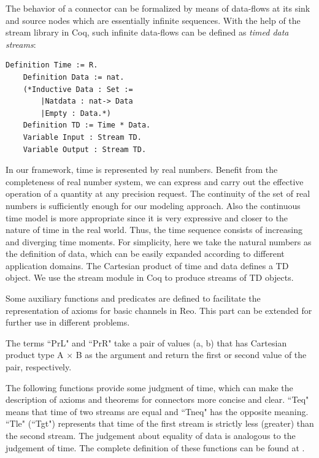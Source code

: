 \documentclass[3p,times]{elsarticle}
\begin{document}
The behavior of a connector can be formalized by means of data-flows at its sink and source nodes which are essentially infinite sequences. With the help of the stream library in Coq, such infinite data-flows can be defined as \emph{timed data streams}:
\begin{lstlisting}[language=coq]
    Definition Time := R.
    Definition Data := nat.
    (*Inductive Data : Set :=
        |Natdata : nat-> Data
        |Empty : Data.*)
    Definition TD := Time * Data.
    Variable Input : Stream TD.
    Variable Output : Stream TD.
\end{lstlisting}
%
In our framework, time is represented by real numbers. Benefit from the completeness of real number system, we can express and carry out the effective operation of a quantity at any precision request.
The continuity of the set of real numbers is sufficiently enough for our modeling approach. Also the
continuous time model is more appropriate since it is very expressive and closer to the nature of time in the real world. Thus, the time sequence consists of increasing and diverging time moments. For simplicity, here we take the natural numbers as the definition of data, which can be easily expanded according to different application domains. The Cartesian product of time and data defines a TD object.
We use the stream module in Coq to produce streams of TD objects.

Some auxiliary functions and predicates are defined to facilitate the representation of axioms for basic channels in Reo. This part can be extended for further use in different problems.

The terms ``PrL" and ``PrR" take a pair of values (a, b) that has Cartesian product type A $\times$ B as the argument and return the first or second value of the pair, respectively.

The following functions provide some judgment of time, which can make
the description of axioms and theorems for connectors more concise and
clear. ``Teq" means that time of two streams are equal and ``Tneq" has the
opposite meaning. ``Tle"  (``Tgt") represents that time of the first stream is
strictly less (greater) than the second stream. The judgement about
equality of data is analogous to the judgement of time. The complete
definition of these functions can be found at \cite{reo2coqfile}.
\end{document}
